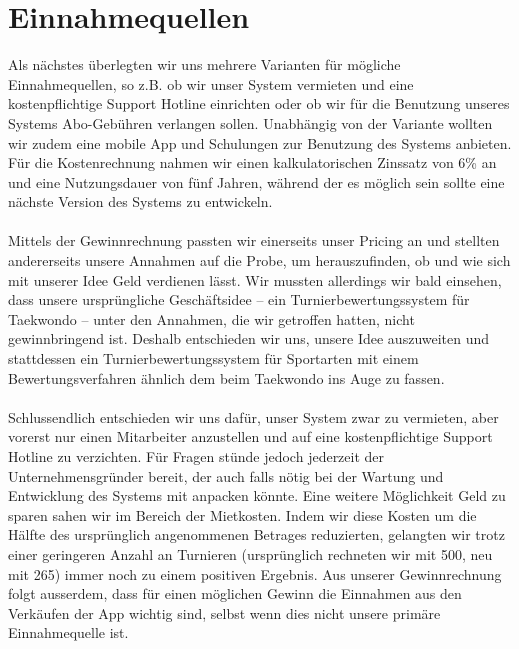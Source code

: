 \section{Einnahmequellen}
Als nächstes überlegten wir uns mehrere Varianten für mögliche Einnahmequellen, so z.B. ob wir unser System vermieten und
    eine kostenpflichtige Support Hotline einrichten oder ob wir für die Benutzung unseres Systems
    Abo-Gebühren verlangen sollen.
Unabhängig von der Variante wollten wir zudem eine mobile App und Schulungen zur Benutzung des Systems anbieten.
Für die Kostenrechnung nahmen wir einen kalkulatorischen Zinssatz von 6\% an und eine Nutzungsdauer von fünf Jahren,
während der es möglich sein sollte eine nächste Version des Systems zu entwickeln.
\\\\
Mittels der Gewinnrechnung passten wir einerseits unser Pricing an und stellten andererseits unsere Annahmen auf die Probe,
um herauszufinden, ob und wie sich mit unserer Idee Geld verdienen lässt.
Wir mussten allerdings wir bald einsehen, dass unsere ursprüngliche Geschäftsidee – ein Turnierbewertungssystem für
Taekwondo – unter den Annahmen, die wir getroffen hatten, nicht gewinnbringend ist.
Deshalb entschieden wir uns, unsere Idee auszuweiten und stattdessen ein Turnierbewertungssystem für Sportarten mit einem
Bewertungsverfahren ähnlich dem beim Taekwondo ins Auge zu fassen.
\\\\
Schlussendlich entschieden wir uns dafür, unser System zwar zu vermieten, aber vorerst nur einen Mitarbeiter anzustellen
und auf eine kostenpflichtige Support Hotline zu verzichten.
Für Fragen stünde jedoch jederzeit der Unternehmensgründer bereit, der auch falls nötig bei der Wartung und Entwicklung
des Systems mit anpacken könnte.
Eine weitere Möglichkeit Geld zu sparen sahen wir im Bereich der Mietkosten.
Indem wir diese Kosten um die Hälfte des ursprünglich angenommenen Betrages reduzierten, gelangten wir trotz einer
geringeren Anzahl an Turnieren (ursprünglich rechneten wir mit 500, neu mit 265) immer noch zu einem positiven Ergebnis.
Aus unserer Gewinnrechnung folgt ausserdem, dass für einen möglichen Gewinn die Einnahmen aus den Verkäufen der App wichtig sind,
selbst wenn dies nicht unsere primäre Einnahmequelle ist.



